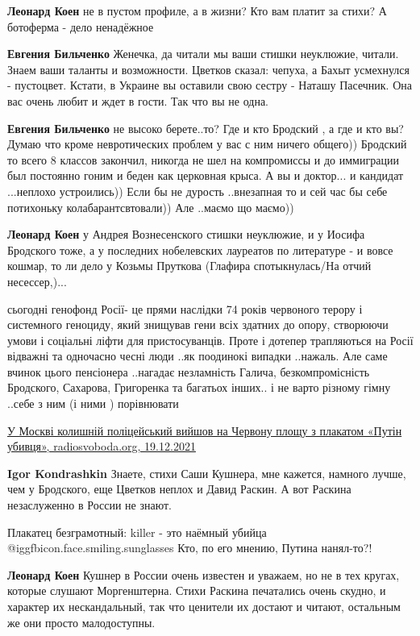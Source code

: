 \begin{itemize}
\begin{itemize}
\textbf{Леонард Коен} не в пустом профиле, а в жизни? Кто вам платит за стихи? А ботоферма - дело ненадёжное

\textbf{Евгения Бильченко} Женечка, да читали мы ваши стишки неуклюжие, читали. Знаем ваши таланты и возможности. Цветков сказал: чепуха, а Бахыт усмехнулся - пустоцвет. Кстати, в Украине вы оставили свою сестру - Наташу Пасечник. Она вас очень любит и ждет в гости. Так что вы не одна.

\textbf{Евгения Бильченко} не высоко берете..то? Где и кто Бродский , а где и кто вы? Думаю что кроме невротических проблем у вас с ним ничего общего)) Бродский то всего 8 классов закончил, никогда не шел на компромиссы и до иммиграции был постоянно гоним и беден как церковная крыса. А вы и доктор... и кандидат ...неплохо устроились)) Если бы не дурость ..внезапная то и сей час бы себе потихоньку колабарантсвтовали)) Але ..маємо що маємо))

\textbf{Леонард Коен} у Андрея Вознесенского стишки неуклюжие, и у Иосифа Бродского тоже, а у последних нобелевских лауреатов по литературе - и вовсе кошмар, то ли дело у Козьмы Пруткова (Глафира спотыкнулась/На отчий несессер,)...


сьогодні генофонд Росії- це прями наслідки 74 років червоного терору і
системного геноциду, який знищував гени всіх здатних до опору, створюючи умови
і соціальні ліфти для пристосуванців. Проте і дотепер трапляються на Росії
відважні та одночасно чесні люди ..як поодинокі випадки ..нажаль. Але саме
вчинок цього пенсіонера ..нагадає незламність Галича, безкомпромісність
Бродского, Сахарова, Григоренка та багатьох інших.. і не варто різному гімну
..себе з ним (і ними ) порівнювати

\href{https://www.radiosvoboda.org/a/news-putin-ubyvtsya/31616453.html}{%
У Москві колишній поліцейський вийшов на Червону площу з плакатом «Путін убивця», radiosvoboda.org, 19.12.2021%
}

\textbf{Igor Kondrashkin} Знаете, стихи Саши Кушнера, мне кажется, намного лучше, чем у Бродского, еще Цветков неплох и Давид Раскин. А вот Раскина незаслуженно в России не знают.

Плакатец безграмотный: killer - это наёмный убийца @igg{fbicon.face.smiling.sunglasses}  Кто, по его мнению, Путина нанял-то?!

\textbf{Леонард Коен} Кушнер в России очень известен и уважаем, но не в тех кругах, которые слушают Моргенштерна. Стихи Раскина печатались очень скудно, и характер их нескандальный, так что ценители их достают и читают, остальным же они просто малодоступны.


\end{itemize}
\end{itemize}
